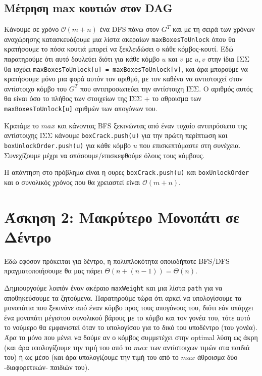 \documentclass[a4paper,11pt]{article}
\begin{document}
\subsection*{Μέτρηση max κουτιών στον DAG}
Κάνουμε σε χρόνο $\mathcal{O}(m+n)$ ένα DFS πάνω στον $G^T$ και με τη σειρά των χρόνων αναχώρησης κατασκευάζουμε μια λίστα ακεραίων \verb|maxBoxesToUnlock| όπου θα κρατήσουμε το πόσα κουτιά μπορεί να ξεκλειδώσει ο κάθε κόμβος-κουτί. Εδώ παρατηρούμε ότι αυτό δουλεύει διότι για κάθε κόμβο $u$ και $v$ με $u, v$ στην ίδια ΙΣΣ θα ισχύει \verb|maxBoxesToUnlock[u] = maxBoxesToUnlock[v]|, και άρα μπορούμε να κρατήσουμε μόνο μια φορά αυτόν τον αριθμό, με τον καθένα να αντιστοιχεί στον αντίστοιχο κόμβο του $G^T$ που αντιπροσωπεύει την αντίστοιχη ΙΣΣ. Ο αριθμός αυτός θα είναι όσο το πλήθος των στοιχείων της ΙΣΣ + το αθροισμα των \verb|maxBoxesToUnlock[u]| αριθμών των απογόνων του.

Κρατάμε το $max$ και κάνοντας BFS ξεκινώντας από έναν τυχαίο αντιπρόσωπο της αντίστοιχης ΙΣΣ κάνουμε \verb|boxCrack.push(u)| για την πρώτη περίπτωση και \verb|boxUnlockOrder.push(u)| για κάθε κόμβο $u$ που επισκεπτόμαστε στη συνέχεια. Συνεχίζουμε μέχρι να σπάσουμε/επισκεφθούμε όλους τους κόμβους.

Η απάντηση στο πρόβλημα είναι η ουρες \verb|boxCrack.push(u)| και \verb|boxUnlockOrder| και ο συνολικός χρόνος που θα χρειαστεί είναι $\mathcal{O}(m+n)$.

\section*{Άσκηση 2: Μακρύτερο Μονοπάτι σε Δέντρο}
Εδώ εφόσον πρόκειται για δέντρο, η πολυπλοκότητα οποιοδήποτε BFS/DFS πραγματοποιήσουμε θα μας πάρει $\Theta(n+(n-1)) = \Theta(n)$.

Δημιουργούμε λοιπόν έναν ακέραιο \verb|maxWeight| και μια λίστα \verb|path| για να αποθηκεύσουμε τα ζητούμενα. Παρατηρούμε τώρα ότι αρκεί να υπολογίσουμε τα μονοπάτια που ξεκινάνε από έναν κόμβο προς τους απογόνους του, διότι εάν υπάρχει ένα μονοπάτι μέγιστου συνολικού βάρους με το κόμβο και τον γονέα του, τότε αυτό το νούμερο θα εμφανιστεί όταν το υπολογίσου για το δικό του υποδέντρο (του γονέα). Άρα το μόνο που μένει να δούμε αν ο κόμβος συμμετέχει στην optimal λύση ως άκρη (και άρα υπολογίζουμε την τιμή του από το $max$ των αντίστοιχων τιμών στα παιδιά του) ή ως μέσο (και άρα υπολογίζουμε την τιμή του από το $max$ άθροισμα δύο -διαφορετικών- παιδιών του).
\end{document}
